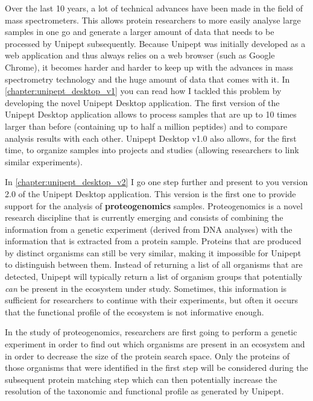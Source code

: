 Over the last 10 years, a lot of technical advances have been made in the field of mass spectrometers.
This allows protein researchers to more easily analyse large samples in one go and generate a larger amount of data that needs to be processed by Unipept subsequently.
Because Unipept was initially developed as a web application and thus always relies on a web browser (such as Google Chrome), it becomes harder and harder to keep up with the advances in mass spectrometry technology and the huge amount of data that comes with it.
In \autoref{chapter:unipept_desktop_v1} you can read how I tackled this problem by developing the novel Unipept Desktop application.
The first version of the Unipept Desktop application allows to process samples that are up to 10 times larger than before (containing up to half a million peptides) and to compare analysis results with each other.
Unipept Desktop v1.0 also allows, for the first time, to organize samples into projects and studies (allowing researchers to link similar experiments).

In \autoref{chapter:unipept_desktop_v2} I go one step further and present to you version 2.0 of the Unipept Desktop application.
This version is the first one to provide support for the analysis of \textbf{proteogenomics} samples.
Proteogenomics is a novel research discipline that is currently emerging and consists of combining the information from a genetic experiment (derived from DNA analyses) with the information that is extracted from a protein sample.
Proteins that are produced by distinct organisms can still be very similar, making it impossible for Unipept to distinguish between them.
Instead of returning a list of all organisms that are detected, Unipept will typically return a list of organism groups that potentially \textit{can} be present in the ecosystem under study.
Sometimes, this information is sufficient for researchers to continue with their experiments, but often it occurs that the functional profile of the ecosystem is not informative enough.

In the study of proteogenomics, researchers are first going to perform a genetic experiment in order to find out which organisms are present in an ecosystem and in order to decrease the size of the protein search space.
Only the proteins of those organisms that were identified in the first step will be considered during the subsequent protein matching step which can then potentially increase the resolution of the taxonomic and functional profile as generated by Unipept.

